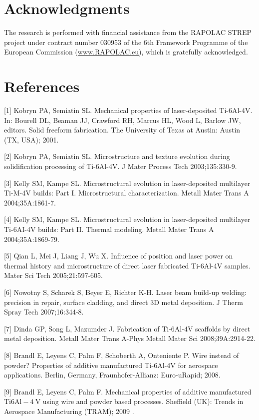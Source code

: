 \documentclass[10pt]{article}
\begin{document}
\section*{Acknowledgments}
The research is performed with financial assistance from the RAPOLAC STREP project under contract number 030953 of the 6th Framework Programme of the European Commission (\href{http://www.RAPOLAC.eu}{www.RAPOLAC.eu}), which is gratefully acknowledged.

\section*{References}
[1] Kobryn PA, Semiatin SL. Mechanical properties of laser-deposited Ti-6Al-4V. In: Bourell DL, Beaman JJ, Crawford RH, Marcus HL, Wood L, Barlow JW, editors. Solid freeform fabrication. The University of Texas at Austin: Austin (TX, USA); 2001.

[2] Kobryn PA, Semiatin SL. Microstructure and texture evolution during solidification processing of Ti-6Al-4V. J Mater Process Tech 2003;135:330-9.

[3] Kelly SM, Kampe SL. Microstructural evolution in laser-deposited multilayer Ti-M-4V builds: Part I. Microstructural characterization. Metall Mater Trans A 2004;35A:1861-7.

[4] Kelly SM, Kampe SL. Microstructural evolution in laser-deposited multilayer Ti-6AI-4V builds: Part II. Thermal modeling. Metall Mater Trans A 2004;35A:1869-79.

[5] Qian L, Mei J, Liang J, Wu X. Influence of position and laser power on thermal history and microstructure of direct laser fabricated Ti-6Al-4V samples. Mater Sci Tech 2005;21:597-605.

[6] Nowotny S, Scharek S, Beyer E, Richter K-H. Laser beam build-up welding: precision in repair, surface cladding, and direct 3D metal deposition. J Therm Spray Tech 2007;16:344-8.

[7] Dinda GP, Song L, Mazumder J. Fabrication of Ti-6Al-4V scaffolds by direct metal deposition. Metall Mater Trans A-Phys Metall Mater Sci 2008;39A:2914-22.

[8] Brandl E, Leyens C, Palm F, Schoberth A, Onteniente P. Wire instead of powder? Properties of additive manufactured Ti-6Al-4V for aerospace applications. Berlin, Germany, Fraunhofer-Allianz: Euro-uRapid; 2008.

[9] Brandl E, Leyens C, Palm F. Mechanical properties of additive manufactured Ti$6 \mathrm{Al}-4 \mathrm{~V}$ using wire and powder based processes. Sheffield (UK): Trends in Aerospace Manufacturing (TRAM); 2009 .
\end{document}
